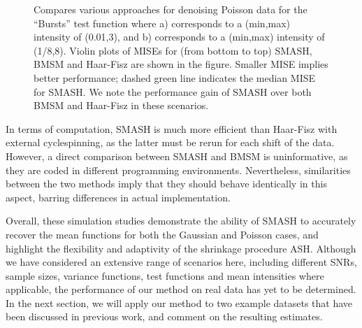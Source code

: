 \documentclass[12pt]{article}
\begin{document}
\begin{figure}
\begin{subfigure}[b]{0.45\textwidth}
        \caption{}
        \label{fig:pois_8}
    \end{subfigure}
    \caption{Compares various approaches for denoising Poisson data for the ``Bursts'' test function where a) corresponds to a (min,max) intensity of (0.01,3), and b) corresponds to a (min,max) intensity of (1/8,8). Violin plots of MISEs for (from bottom to top) SMASH, BMSM and Haar-Fisz are shown in the figure. Smaller MISE implies better performance; dashed green line indicates the median MISE for SMASH. We note the performance gain of SMASH over both BMSM and Haar-Fisz in these scenarios.}
    \label{fig:pois_sim}
\end{figure}

In terms of computation, SMASH is much more efficient than Haar-Fisz with external cyclespinning, as the latter must be rerun for each shift of the data. However, a direct comparison between SMASH and BMSM is uninformative, as they are coded in different programming environments. Nevertheless, similarities between the two methods imply that they should behave identically in this aspect, barring differences in actual implementation.

Overall, these simulation studies demonstrate the ability of SMASH to accurately recover the mean functions for both the Gaussian and Poisson cases, and highlight the flexibility and adaptivity of the shrinkage procedure ASH. Although we have considered an extensive range of scenarios here, including different SNRs, sample sizes, variance functions, test functions and mean intensities where applicable, the performance of our method on real data has yet to be determined. In the next section, we will apply our method to two example datasets that have been discussed in previous work, and comment on the resulting estimates.
\end{document}
